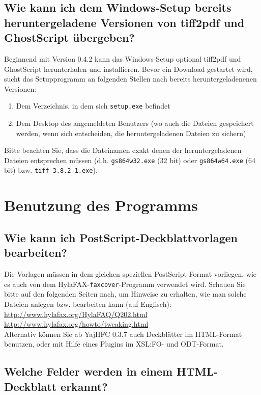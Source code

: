 \documentclass[a4paper,10pt,halfparskip,noparindent]{scrartcl}
\begin{document}
\subsection{Wie kann ich dem Windows-Setup bereits heruntergeladene Versionen von tiff2pdf und GhostScript übergeben?}

Beginnend mit Version 0.4.2 kann das Windows-Setup optional tiff2pdf und GhostScript herunterladen und installieren.
Bevor ein Download gestartet wird, sucht das Setupprogramm an folgenden Stellen nach bereits heruntergeladenenen Versionen:
\begin{enumerate}
 \item Dem Verzeichnis, in dem sich \texttt{setup.exe} befindet
 \item Dem Desktop des angemeldeten Benutzers (wo auch die Dateien gespeichert werden, wenn sich entscheiden, die heruntergeladenen Dateien zu sichern)
\end{enumerate}

Bitte beachten Sie, dass die Dateinamen exakt denen der heruntergeladenen Dateien entsprechen müssen (d.h.  \texttt{gs864w32.exe} (32 bit) oder \texttt{gs864w64.exe} (64 bit) bzw. \texttt{tiff-3.8.2-1.exe}).

\section{Benutzung des Programms}	

\subsection{Wie kann ich PostScript-Deckblattvorlagen bearbeiten?}
Die Vorlagen müssen in dem gleichen speziellen PostScript-Format vorliegen,
wie es auch von dem HylaFAX-\texttt{faxcover}-Programm verwendet wird.
Schauen Sie bitte auf den folgenden Seiten nach, um Hinweise zu erhalten, wie 
man solche Dateien anlegen bzw. bearbeiten kann (auf Englisch):\\
\url{http://www.hylafax.org/HylaFAQ/Q202.html}\\
\url{http://www.hylafax.org/howto/tweaking.html}\\

Alternativ können Sie ab YajHFC 0.3.7 auch Deckblätter im HTML-Format benutzen, oder mit Hilfe eines Plugins im XSL:FO- und ODT-Format.

\subsection{Welche Felder werden in einem HTML-Deckblatt erkannt?}
\end{document}
